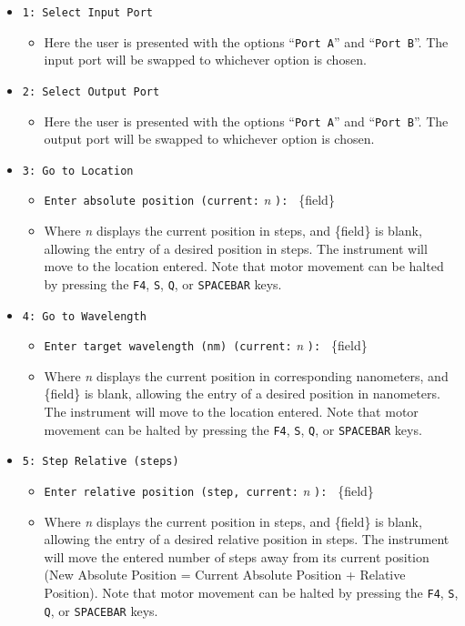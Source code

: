 \documentclass{article}
\begin{document}
\begin{itemize}
    \item \verb|1: Select Input Port|
    \begin{itemize}
        \item Here the user is presented with the options ``\verb|Port A|'' and ``\verb|Port B|''. The input port will be swapped to whichever option is chosen.
    \end{itemize}
    \item \verb|2: Select Output Port|
    \begin{itemize}
        \item Here the user is presented with the options ``\verb|Port A|'' and ``\verb|Port B|''. The output port will be swapped to whichever option is chosen.
    \end{itemize}
    \item \verb|3: Go to Location|
    \begin{itemize}
        \item \verb|Enter absolute position (current:| \emph{n} \verb|): | \{field\}
        \item Where \emph{n} displays the current position in steps, and \{field\} is blank, allowing the entry of a desired position in steps. The instrument will move to the location entered. Note that motor movement can be halted by pressing the \verb|F4|, \verb|S|, \verb|Q|, or \verb|SPACEBAR| keys.
    \end{itemize}
    \item \verb|4: Go to Wavelength|
    \begin{itemize}
        \item \verb|Enter target wavelength (nm) (current:| \emph{n} \verb|): | \{field\}
        \item Where \emph{n} displays the current position in corresponding nanometers, and \{field\} is blank, allowing the entry of a desired position in nanometers. The instrument will move to the location entered. Note that motor movement can be halted by pressing the \verb|F4|, \verb|S|, \verb|Q|, or \verb|SPACEBAR| keys.
    \end{itemize}
    \item \verb|5: Step Relative (steps)|
    \begin{itemize}
        \item \verb|Enter relative position (step, current:| \emph{n} \verb|): | \{field\}
        \item Where \emph{n} displays the current position in steps, and \{field\} is blank, allowing the entry of a desired relative position in steps. The instrument will move the entered number of steps away from its current position (New Absolute Position = Current Absolute Position + Relative Position). Note that motor movement can be halted by pressing the \verb|F4|, \verb|S|, \verb|Q|, or \verb|SPACEBAR| keys.

\end{itemize}
\end{itemize}
\end{document}
